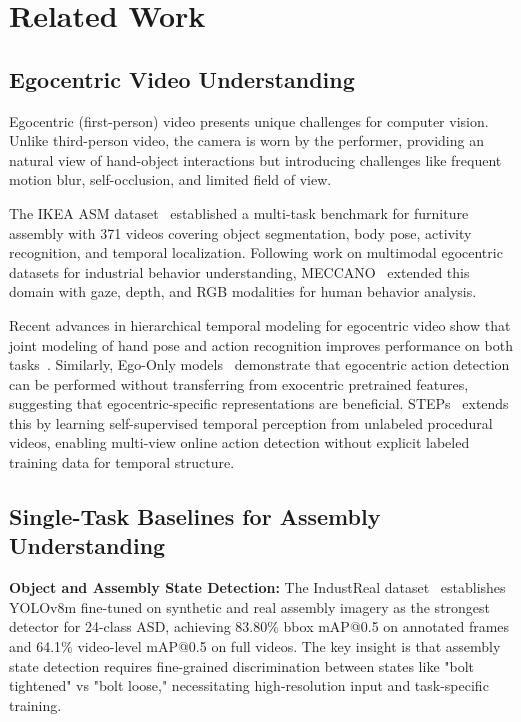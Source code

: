 \documentclass[11pt,a4paper]{article}
\begin{document}
\section{Related Work}
\label{sec:related}

\subsection{Egocentric Video Understanding}

Egocentric (first-person) video presents unique challenges for computer vision. Unlike third-person video, the camera is worn by the performer, providing an natural view of hand-object interactions but introducing challenges like frequent motion blur, self-occlusion, and limited field of view.

The IKEA ASM dataset~\cite{benshabat2021ikea} established a multi-task benchmark for furniture assembly with 371 videos covering object segmentation, body pose, activity recognition, and temporal localization. Following work on multimodal egocentric datasets for industrial behavior understanding, MECCANO~\cite{ragusa2022meccano} extended this domain with gaze, depth, and RGB modalities for human behavior analysis.

Recent advances in hierarchical temporal modeling for egocentric video show that joint modeling of hand pose and action recognition improves performance on both tasks~\cite{wen2022hierarchical}. Similarly, Ego-Only models~\cite{wang2023ego} demonstrate that egocentric action detection can be performed without transferring from exocentric pretrained features, suggesting that egocentric-specific representations are beneficial. STEPs~\cite{shah2023steps} extends this by learning self-supervised temporal perception from unlabeled procedural videos, enabling multi-view online action detection without explicit labeled training data for temporal structure.

\subsection{Single-Task Baselines for Assembly Understanding}

\textbf{Object and Assembly State Detection:} The IndustReal dataset~\cite{schoonbeek2024industreal} establishes YOLOv8m fine-tuned on synthetic and real assembly imagery as the strongest detector for 24-class ASD, achieving 83.80\% bbox mAP@0.5 on annotated frames and 64.1\% video-level mAP@0.5 on full videos. The key insight is that assembly state detection requires fine-grained discrimination between states like "bolt tightened" vs "bolt loose," necessitating high-resolution input and task-specific training.
\end{document}
